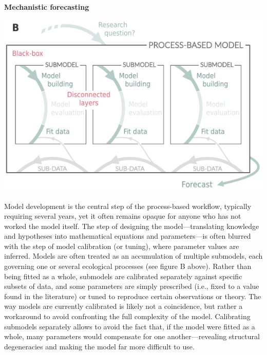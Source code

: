 \documentclass[11pt]{article}
\begin{document}
\begin{tcolorbox}
{\begin{multicols}{2}
\vfill

\columnbreak

\centerline{\bf Mechanistic forecasting}
\vspace*{2mm}
\begin{minipage}[t]{\linewidth}
    \includegraphics[width=\linewidth]{../figures/forecasting_details}

    \vspace*{1mm}
\end{minipage}

\noindent %
Model development is the central step of the process-based workflow, typically requiring several years, yet it often remains opaque for anyone who has not worked the model itself. The step of designing the model---translating knowledge and hypotheses into mathematical equations and parameters---is often blurred with the step of model calibration (or tuning), where parameter values are inferred. Models are often treated as an accumulation of multiple submodels, each governing one or several ecological processes (see figure B above). Rather than being fitted as a whole, submodels are calibrated separately against specific subsets of data, and some parameters are simply prescribed (i.e., fixed to a value found in the literature) or tuned to reproduce certain observations or theory. The way models are currently calibrated is likely not a coincidence, but rather a workaround to avoid confronting the full complexity of the model. Calibrating submodels separately allows to avoid the fact that, if the model were fitted as a whole, many parameters would compensate for one another---revealing structural degeneracies and making the model far more difficult to use.


\end{multicols}}
\end{tcolorbox}
\end{document}
